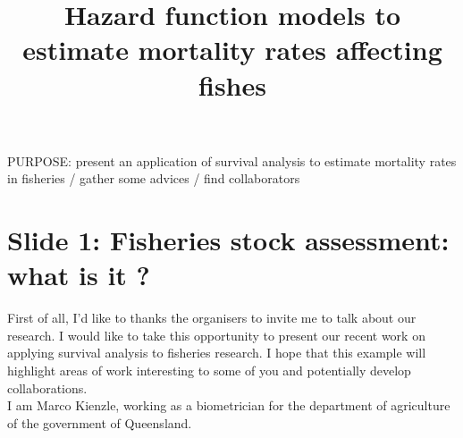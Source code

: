 \documentclass[11pt]{article}
\begin{document}
\title{Hazard function models to estimate mortality rates affecting fishes}

\maketitle

PURPOSE: present an application of survival analysis to estimate mortality rates in fisheries / gather some advices / find collaborators

\tableofcontents


\section{Slide 1: Fisheries stock assessment: what is it ?}

First of all, I'd like to thanks the organisers to invite me to talk about our research. I would like to take this opportunity to present our recent work on applying survival analysis to fisheries research. I hope that this example will highlight areas of work interesting to some of you and potentially develop collaborations.\\
I am Marco Kienzle, working as a biometrician for the department of agriculture of the government of Queensland.


\end{document}
